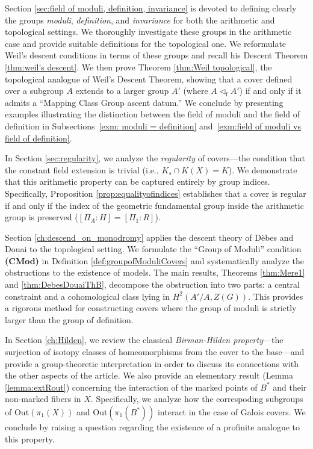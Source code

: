 \documentclass[10pt]{amsart}
\theoremstyle{definition}
\begin{document}
Section \ref{sec:field of moduli, definition, invariance} is devoted to defining clearly the groups \textit{moduli}, \textit{definition}, and \textit{invariance} for both the arithmetic and topological settings. We thoroughly investigate these groups in the arithmetic case and provide suitable definitions for the topological one. We reformulate Weil's descent conditions in terms of these groups and recall his Descent Theorem \ref{thm:weil's descent}. We then prove Theorem \ref{thm:Weil topological}, the topological analogue of Weil’s Descent Theorem, showing that a cover defined over a subgroup $A$ extends to a larger group $A'$ (where $A \lhd_\mathrm{f} A'$) if and only if it admits a ``Mapping Class Group ascent datum.'' We conclude by presenting examples illustrating the distinction between the field of moduli and the field of definition in Subsections~\ref{exm: moduli = definition} and~\ref{exm:field of moduli vs field of definition}.

In Section \ref{sec:regularity}, we analyze the \textit{regularity} of covers—the condition that the constant field extension is trivial (i.e., $K_s \cap K(X) = K$). We demonstrate that this arithmetic property can be captured entirely by group indices. Specifically, Proposition \ref{prop:equalityofindices} establishes that a cover is regular if and only if the index of the geometric fundamental group inside the arithmetic group is preserved ($[\Pi_A:H] = [\Pi_1:R]$). 

Section \ref{ch:descend_on_monodromy} applies the descent theory of Dèbes and Douai to the topological setting. We formulate the ``Group of Moduli'' condition \textbf{(CMod)} in Definition \ref{def:groupofModuliCovers} and systematically analyze the obstructions to the existence of models. The main results, Theorems \ref{thm:Mere1} and \ref{thm:DebesDouaiThB}, decompose the obstruction into two parts: a central constraint and a cohomological class lying in $H^2(A'/A, Z(G))$. This provides a rigorous method for constructing covers where the group of moduli is strictly larger than the group of definition.


In Section \ref{ch:Hilden}, we review the classical \textit{Birman-Hilden property}—the surjection of isotopy classes of homeomorphisms from the cover to the base—and provide a group-theoretic interpretation in order to discuss its connections with the other aspects of the article. We also provide an elementary result (Lemma \ref{lemma:extRout}) concerning the interaction of the marked points of $B^*$ and their non-marked fibers in $X$. 
Specifically, we analyze how the correspoding subgroups of $\mathrm{Out}(\pi_1(X))$ and $\mathrm{Out}(\pi_1(B^*))$ interact in the case of Galois covers. We conclude by raising a question regarding the existence of a profinite analogue to this property.
\end{document}
